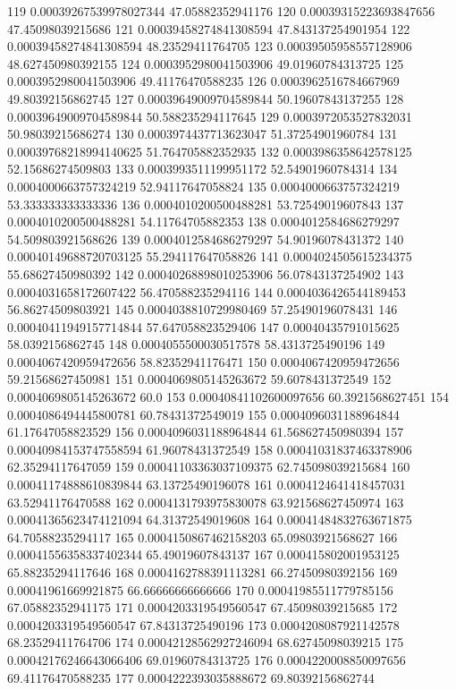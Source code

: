 {119 0.00039267539978027344 47.05882352941176
120 0.00039315223693847656 47.45098039215686
121 0.00039458274841308594 47.843137254901954
122 0.00039458274841308594 48.23529411764705
123 0.00039505958557128906 48.627450980392155
124 0.0003952980041503906 49.01960784313725
125 0.0003952980041503906 49.41176470588235
126 0.0003962516784667969 49.80392156862745
127 0.00039649009704589844 50.19607843137255
128 0.00039649009704589844 50.588235294117645
129 0.0003972053527832031 50.98039215686274
130 0.0003974437713623047 51.37254901960784
131 0.00039768218994140625 51.764705882352935
132 0.0003986358642578125 52.15686274509803
133 0.0003993511199951172 52.54901960784314
134 0.0004000663757324219 52.94117647058824
135 0.0004000663757324219 53.333333333333336
136 0.0004010200500488281 53.72549019607843
137 0.0004010200500488281 54.11764705882353
138 0.0004012584686279297 54.509803921568626
139 0.0004012584686279297 54.90196078431372
140 0.00040149688720703125 55.294117647058826
141 0.0004024505615234375 55.68627450980392
142 0.00040268898010253906 56.07843137254902
143 0.0004031658172607422 56.470588235294116
144 0.0004036426544189453 56.86274509803921
145 0.0004038810729980469 57.25490196078431
146 0.00040411949157714844 57.647058823529406
147 0.00040435791015625 58.0392156862745
148 0.0004055500030517578 58.4313725490196
149 0.0004067420959472656 58.82352941176471
150 0.0004067420959472656 59.21568627450981
151 0.0004069805145263672 59.6078431372549
152 0.0004069805145263672 60.0
153 0.00040841102600097656 60.3921568627451
154 0.0004086494445800781 60.78431372549019
155 0.0004096031188964844 61.17647058823529
156 0.0004096031188964844 61.568627450980394
157 0.00040984153747558594 61.96078431372549
158 0.00041031837463378906 62.35294117647059
159 0.00041103363037109375 62.745098039215684
160 0.00041174888610839844 63.13725490196078
161 0.0004124641418457031 63.52941176470588
162 0.0004131793975830078 63.921568627450974
163 0.00041365623474121094 64.31372549019608
164 0.00041484832763671875 64.70588235294117
165 0.0004150867462158203 65.09803921568627
166 0.00041556358337402344 65.49019607843137
167 0.000415802001953125 65.88235294117646
168 0.0004162788391113281 66.27450980392156
169 0.00041961669921875 66.66666666666666
170 0.00041985511779785156 67.05882352941175
171 0.0004203319549560547 67.45098039215685
172 0.0004203319549560547 67.84313725490196
173 0.0004208087921142578 68.23529411764706
174 0.00042128562927246094 68.62745098039215
175 0.00042176246643066406 69.01960784313725
176 0.0004220008850097656 69.41176470588235
177 0.0004222393035888672 69.80392156862744
}
